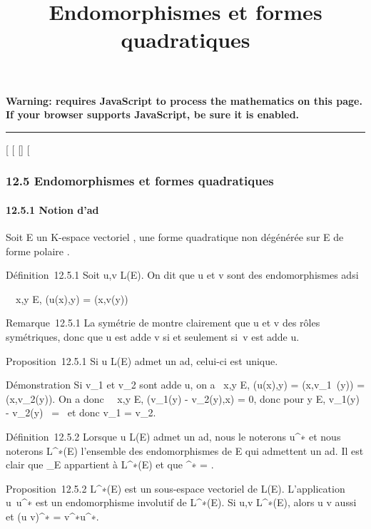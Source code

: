 \documentclass[]{article}
\title{Endomorphismes et formes quadratiques}
\author{}
\date{}
\begin{document}
\maketitle

\textbf{Warning: 
requires JavaScript to process the mathematics on this page.\\ If your
browser supports JavaScript, be sure it is enabled.}

\begin{center}\rule{3in}{0.4pt}\end{center}

{[}
{[}
{[}{]}
{[}

\subsubsection{12.5 Endomorphismes et formes quadratiques}

\paragraph{12.5.1 Notion d'ad\jmathoint}

Soit E un K-espace vectoriel , \Phi une forme quadratique non dégénérée sur
E de forme polaire \phi.

Définition~12.5.1 Soit u,v \in L(E). On dit que u et v sont des
endomorphismes ad\jmathoints si

\forall~~x,y \in E, \phi(u(x),y) = \phi(x,v(y))

Remarque~12.5.1 La symétrie de \phi montre clairement que u et v \jmathouent des
rôles symétriques, donc que u est ad\jmathoint de v si et seulement si~v est
ad\jmathoint de u.

Proposition~12.5.1 Si u \in L(E) admet un ad\jmathoint, celui-ci est unique.

Démonstration Si v\_1 et v\_2 sont ad\jmathoints de u, on a
\forall~x,y \in E, \phi(u(x),y) = \phi(x,v\_1~(y)) =
\phi(x,v\_2(y)). On a donc \forall~~x,y \in E,
\phi(v\_1(y) - v\_2(y),x) = 0, donc pour y \in E,
v\_1(y) - v\_2(y)
\in\mathrmKer~\phi =
\0\ et donc v\_1 =
v\_2.

Définition~12.5.2 Lorsque u \in L(E) admet un ad\jmathoint, nous le noterons
u^∗ et nous noterons L^∗(E) l'ensemble des
endomorphismes de E qui admettent un ad\jmathoint. Il est clair que
\mathrmId\_E appartient à L^∗(E)
et que \mathrmId^∗ =
\mathrmId.

Proposition~12.5.2 L^∗(E) est un sous-espace vectoriel de
L(E). L'application u\mapsto~u^∗ est un
endomorphisme involutif de L^∗(E). Si u,v \in
L^∗(E), alors u \cdot v aussi et (u \cdot v)^∗ =
v^∗\cdot u^∗.
\end{document}
